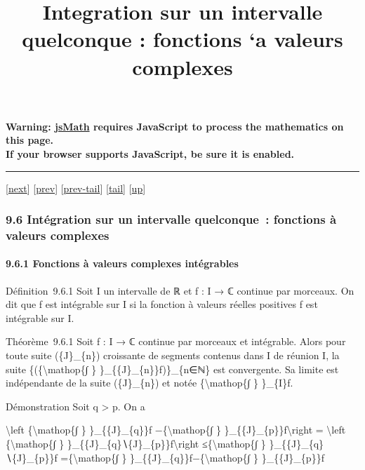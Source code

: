 \documentclass[]{article}
\title{Integration sur un intervalle quelconque : fonctions `a valeurs
complexes}
\author{}
\date{}
\begin{document}
\maketitle

\textbf{Warning: \href{http://www.math.union.edu/locate/jsMath}{jsMath}
requires JavaScript to process the mathematics on this page.\\ If your
browser supports JavaScript, be sure it is enabled.}

\begin{center}\rule{3in}{0.4pt}\end{center}

{[}\href{coursse56.html}{next}{]} {[}\href{coursse54.html}{prev}{]}
{[}\href{coursse54.html\#tailcoursse54.html}{prev-tail}{]}
{[}\hyperref[tailcoursse55.html]{tail}{]}
{[}\href{coursch10.html\#coursse55.html}{up}{]}

\subsubsection{9.6 Intégration sur un intervalle quelconque~: fonctions
à valeurs complexes}

\paragraph{9.6.1 Fonctions à valeurs complexes intégrables}

Définition~9.6.1 Soit I un intervalle de ℝ et f : I → ℂ continue par
morceaux. On dit que f est intégrable sur I si la fonction à valeurs
réelles positives \textbar{}f\textbar{} est intégrable sur I.

Théorème~9.6.1 Soit f : I → ℂ continue par morceaux et intégrable. Alors
pour toute suite (\{J\}\_\{n\}) croissante de segments contenus dans I
de réunion I, la suite \{(\{\textbackslash{}mathop\{∫ \}
\}\_\{\{J\}\_\{n\}\}f)\}\_\{n∈ℕ\} est convergente. Sa limite est
indépendante de la suite (\{J\}\_\{n\}) et notée
\{\textbackslash{}mathop\{∫ \} \}\_\{I\}f.

Démonstration Soit q \textgreater{} p. On a

\textbackslash{}left \textbar{}\{\textbackslash{}mathop\{∫ \}
\}\_\{\{J\}\_\{q\}\}f −\{\textbackslash{}mathop\{∫ \}
\}\_\{\{J\}\_\{p\}\}f\textbackslash{}right \textbar{} =
\textbackslash{}left \textbar{}\{\textbackslash{}mathop\{∫ \}
\}\_\{\{J\}\_\{q\}∖\{J\}\_\{p\}\}f\textbackslash{}right
\textbar{}≤\{\textbackslash{}mathop\{∫ \}
\}\_\{\{J\}\_\{q\}∖\{J\}\_\{p\}\}\textbar{}f\textbar{}
=\{\textbackslash{}mathop\{∫ \}
\}\_\{\{J\}\_\{q\}\}\textbar{}f\textbar{}−\{\textbackslash{}mathop\{∫ \}
\}\_\{\{J\}\_\{p\}\}\textbar{}f\textbar{}
\end{document}
